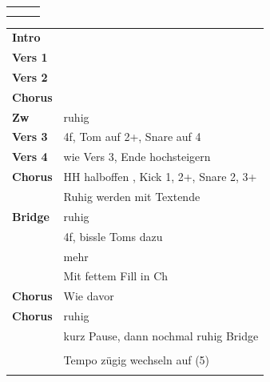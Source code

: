 

\begin{tabular}{p{0.6cm}p{12cm}p{1.4cm}}
	\rowcolor{cyan} \myRow{\thesongnumber} & \myRow{Gekrönt} & \myRow{86} \\
	                                       &                 &             \\
\end{tabular}

\begin{tabular}{p{1.6cm}l}
	\textbf{Intro}  & \\
	\textbf{Vers 1} & \\
	\textbf{Vers 2} & \\
	\textbf{Chorus} & \\
    \textbf{Zw} & ruhig \\
	\textbf{Vers 3} & 4f, Tom auf 2+, Snare auf 4\\
	\textbf{Vers 4} & wie Vers 3, Ende hochsteigern\\
	\textbf{Chorus} & HH halboffen \sechzehntel, Kick 1, 2+, Snare 2, 3+ \\
					& Ruhig werden mit Textende \\
	\textbf{Bridge} & ruhig \\
    & 4f, bissle Toms dazu \\
    & mehr \\
    & Mit fettem Fill in Ch \\
	\textbf{Chorus} & Wie davor \\
	\textbf{Chorus} & ruhig \\
	 				& kurz Pause, dann nochmal ruhig Bridge \\
	 				& \\
	 				& Tempo zügig wechseln auf (5) \\
	 				& \\
\end{tabular}
